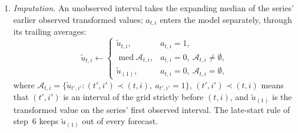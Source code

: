 \begin{enumerate}
  \[
    \tilde u_{t,i} \leftarrow \clip\bigl(\tilde u_{t,i},\ \underline Q^{(u)}_{t,i},\ \overline Q^{(u)}_{t,i}\bigr),
  \]
  where $\underline Q^{(u)}_{t,i}$ and $\overline Q^{(u)}_{t,i}$ are the empirical \rhdmWinsorLoPct{}st and
  \rhdmWinsorHiPct{}th percentiles of $\mathcal U_{t,i}$, the levels of the target's winsorization
  (Section~\ref{sec:rh_methods_setup}).
  \begin{itemize}
  \item The bounds are defined only when all $n_{\mathrm{w}}$ values of $\mathcal U_{t,i}$ exist, after the forward
    fill of at most \rhdsFfillCap{} intervals; otherwise the interval is not clipped. Series whose prints leave longer
    gaps are therefore clipped only where a full window of values precedes the interval: VIX3M and VVIX, which print
    only part of the day, never; the VIX and the constituent aggregates on part of the sample; the futures' own
    moments and liquidity series, which print on every interval of the grid, throughout.
  \item The FOMC series are not winsorized (Appendix~\ref{app:rh_dp_fomc}).
  \end{itemize}
\item \emph{Imputation.} An unobserved interval takes the expanding median of the series' earlier observed
  transformed values; $a_{t,i}$ enters the model separately, through its trailing averages:
  \[
    \tilde u_{t,i} \leftarrow
    \begin{cases}
      \tilde u_{t,i}, & a_{t,i} = 1,\\
      \operatorname{med}\mathcal{A}_{t,i}, & a_{t,i} = 0,\ \mathcal{A}_{t,i} \ne \emptyset,\\
      \tilde u_{(1)}, & a_{t,i} = 0,\ \mathcal{A}_{t,i} = \emptyset,
    \end{cases}
  \]
  where $\mathcal{A}_{t,i} = \{\tilde u_{t',i'} : (t',i') \prec (t,i),\ a_{t',i'} = 1\}$, $(t',i') \prec (t,i)$ means
  that $(t',i')$ is an interval of the grid strictly before $(t,i)$, and $\tilde u_{(1)}$ is the transformed value on
  the series' first observed interval. The late-start rule of step~6 keeps $\tilde u_{(1)}$ out of every forecast.
\end{enumerate}
